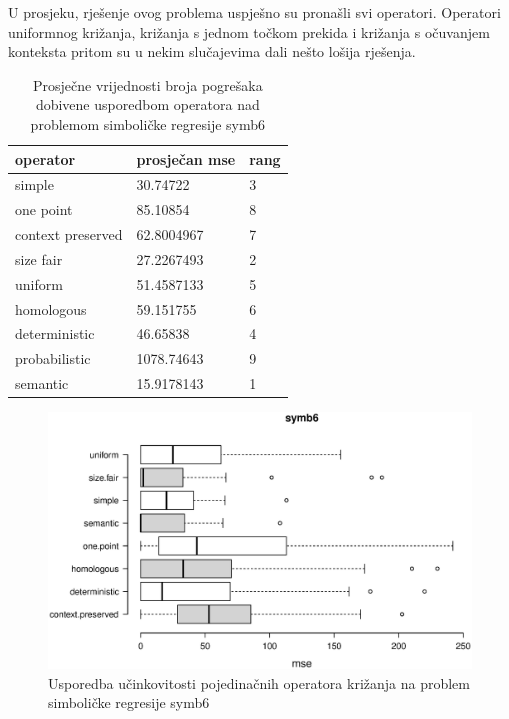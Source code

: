 U prosjeku, rješenje ovog problema uspješno su pronašli svi operatori. Operatori uniformnog križanja, križanja s jednom točkom prekida i križanja s očuvanjem konteksta pritom su u nekim slučajevima dali nešto lošija rješenja.

\begin{table}[H]
 	\centering

    \begin{tabular}{| l | l | l |}
    \hline
    \textbf{operator} & \textbf{prosječan mse} & \textbf{rang}\\ \hline
    simple & 30.74722 & 3\\ \hline
    one point & 85.10854 & 8\\ \hline
    context preserved & 62.8004967 & 7\\ \hline
    size fair & 27.2267493 & 2\\ \hline
    uniform & 51.4587133 & 5\\ \hline
    homologous & 59.151755 & 6\\ \hline
    deterministic & 46.65838 & 4\\ \hline
    probabilistic & 1078.74643 & 9\\ \hline
    semantic & 15.9178143 & 1\\ \hline
    \end{tabular}
    
    \caption{Prosječne vrijednosti broja pogrešaka dobivene usporedbom operatora nad problemom simboličke regresije symb6}
    \label{symb6table}
\end{table}

\begin{figure}[H]
	\centering
	\includegraphics[trim=0cm 4cm 0cm 0cm, scale=0.5]{./slike/boxPlots/symb6.eps}
	\caption{Usporedba učinkovitosti pojedinačnih operatora križanja na problem simboličke regresije symb6}
	\label{symb6box}
\end{figure}



